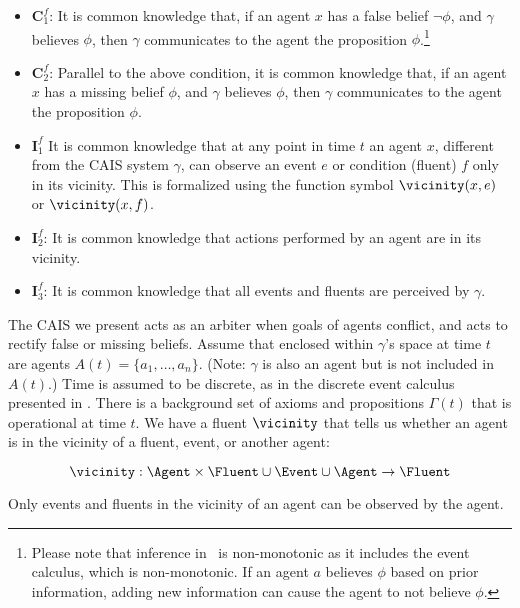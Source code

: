     \begin{itemize}
    \item $\mathbf{C}^f_1$: It is common knowledge that, if an agent
      $x$ has a false belief $\lnot \phi$, and $\gamma$
      believes $\phi$, then $\gamma$ communicates to the agent the
      proposition $\phi$.\footnote{Please note that inference in
        \DCEC\ is non-monotonic as it includes the event calculus,
        which is non-monotonic.  If an agent $a$ believes $\phi$ based
        on prior information, adding new information can cause the
        agent to not believe $\phi$.}

    \item $\mathbf{C}^f_2$: Parallel to the above condition, it is
      common knowledge that, if an agent $x$ has a missing belief
      $\phi$, and $\gamma$ believes $\phi$, then $\gamma$ communicates to
      the agent the proposition $\phi$.

    \item$\mathbf{I}^f_1$ It is common knowledge that at any point in
      time $t$ an agent $x$, different from the CAIS system $\gamma$,
      can observe an event $e$ or condition (fluent) $f$ only in its
      vicinity. This is formalized using the function symbol
      $\vicinity(x, e)$ or $\vicinity(x, f)$.

      \item $\mathbf{I}^f_2$: It is common knowledge that actions
        performed by an agent are in its vicinity.

      \item $\mathbf{I}^f_3$: It is common knowledge that all events
        and fluents are perceived by $\gamma$.
     \end{itemize}

The CAIS we present acts as an arbiter when goals of agents conflict,
and acts to rectify false or missing beliefs.  Assume that enclosed
within $\gamma$'s space at time $t$ are agents
$A(t) = \{a_1, \ldots, a_n\}$.  (Note: $\gamma$ is also an agent but
is not included in $A(t)$.)  Time is assumed to be discrete, as in the
discrete event calculus presented in \cite{mueller_commonsense_2014}.  There is a
background set of axioms and propositions $\Gamma(t)$ that is
operational at time $t$.  We have a fluent $\vicinity$ that tells us
whether an agent is in the vicinity of a fluent, event, or another
agent:

$$\vicinity: \Agent \times \Fluent \cup \Event \cup \Agent \rightarrow
\Fluent $$

Only events and fluents in the vicinity of an agent can be
observed by the agent.

